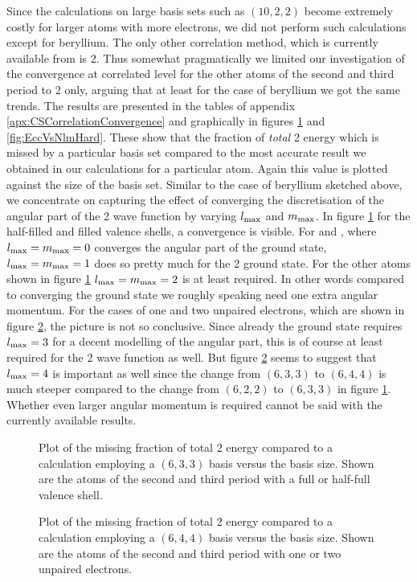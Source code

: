 Since the \FCI calculations on large basis sets such as $(10,2,2)$ become
extremely costly for larger atoms with more electrons,
we did not perform such calculations except for beryllium.
The only other correlation method,
which is currently available from \molsturm is {\MP}2.
Thus somewhat pragmatically we limited
our investigation of the convergence at correlated level
for the other atoms of the second and third period to {\MP}2 only,
arguing that at least for the case of beryllium we got the same trends.
The results are presented in the tables of appendix
\vref{apx:CSCorrelationConvergence} and graphically
in figures \ref{fig:EccVsNlmEasy} and \vref{fig:EccVsNlmHard}.
These show that the fraction of \emph{total} {\MP}2 energy
which is missed by a particular basis set compared to the most
accurate result we obtained in our calculations for a particular atom.
Again this value is plotted against the size of the basis set.
Similar to the case of beryllium sketched above,
we concentrate on capturing the effect of converging the discretisation
of the angular part of the {\MP}2 wave function
by varying $l_\text{max}$ and $m_\text{max}$.
In figure \ref{fig:EccVsNlmEasy} for the half-filled
and filled valence shells,
a convergence is visible.
For  and ,
where $l_\text{max} = m_\text{max} = 0$ converges the angular part of the \HF ground state,
$l_\text{max} = m_\text{max} = 1$ does so pretty much for the {\MP}2 ground state.
For the other atoms shown in figure \ref{fig:EccVsNlmEasy} $l_\text{max} = m_\text{max} = 2$
is at least required.
In other words compared to converging the \HF ground state
we roughly speaking need one extra angular momentum.
For the cases of one and two unpaired electrons,
which are shown in figure \ref{fig:EccVsNlmHard},
the picture is not so conclusive.
Since already the \HF ground state requires $l_\text{max} = 3$
for a decent modelling of the angular part,
this is of course at least required for the {\MP}2 wave function as well.
But figure \ref{fig:EccVsNlmHard} seems to suggest
that $l_\text{max} = 4$ is important as well
since the change from $(6,3,3)$ to $(6,4,4)$ is much
steeper compared to the change from $(6,2,2)$ to $(6,3,3)$ in figure \ref{fig:EccVsNlmEasy}.
Whether even larger angular momentum is required cannot be said
with the currently available results.

\begin{figure}
	\centering
	\caption[
		Missing fraction of {\MP}2 energy versus \CS basis size
	]{
		Plot of the
		missing fraction of total {\MP}2 energy
		compared to a calculation employing a $(6,3,3)$ \CS basis
		versus the basis size.
		Shown are the atoms of the second and third period
		with a full or half-full valence shell.
	}
	\label{fig:EccVsNlmEasy}
\end{figure}
\begin{figure}
	\centering
	\caption[
		Missing fraction of {\MP}2 energy versus \CS basis size (plot 2)
	]{
		Plot of the
		missing fraction of total {\MP}2 energy
		compared to a calculation employing a $(6,4,4)$ \CS basis
		versus the basis size.
		Shown are the atoms of the second and third period
		with one or two unpaired electrons.
	}
	\label{fig:EccVsNlmHard}
\end{figure}

